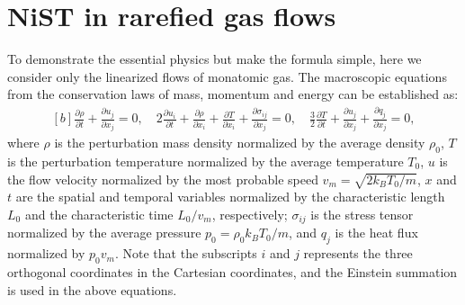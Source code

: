 \documentclass[lineno]{jfm}
\begin{document}

\section{{NiST} in rarefied gas flows}\label{generalForm}
	
To demonstrate the essential physics but make the formula simple, here we consider only the linearized flows of monatomic gas. The macroscopic equations from the conservation laws of mass, momentum and energy can be established as:
	\begin{equation}\label{eq7}
		\begin{aligned}[b]
			\frac{\partial \rho}{\partial t} + \frac{\partial u_j}{\partial x_j} = 0, \quad
			2\frac{\partial u_i}{\partial t} + \frac{\partial \rho}{\partial x_i} + \frac{\partial T}{\partial x_i} + \frac{\partial \sigma_{ij}}{\partial x_j}= 0, \quad
			\frac{3}{2}\frac{\partial T}{\partial t}+\frac{\partial u_j}{\partial x_j}
			+\frac{\partial q_j}{\partial x_j}=0,
		\end{aligned}
	\end{equation}
where $\rho$ is the perturbation mass density normalized by the average density $\rho_0$, $T$ is the perturbation temperature normalized by the average temperature $T_0$, $u$ is the flow velocity normalized by the most probable speed $v_m=\sqrt{2k_BT_0/m}$, $x$ and $t$ are the spatial and temporal variables normalized by the characteristic length $L_0$ and the characteristic time $L_0/v_m$, respectively; $\sigma_{ij}$ is the stress tensor normalized by the average pressure $p_0=\rho_0k_B T_0/m$, and $q_j$ is the heat flux normalized by $p_0v_m$. Note that the subscripts $i$ and $j$ represents the three orthogonal coordinates in the Cartesian coordinates, and the Einstein summation is used in the above equations.  %
	
\end{document}
